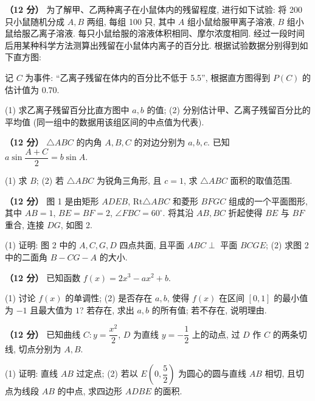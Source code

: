 \Needspace{0.4\textheight}
\begin{question}
\textbf{（12 分）} 
为了解甲、乙两种离子在小鼠体内的残留程度, 进行如下试验: 将 200 只小鼠随机分成 $A, B$ 两组, 每组 100 只, 其中 $A$ 组小鼠给服甲离子溶液, $B$ 组小鼠给服乙离子溶液. 每只小鼠给服的溶液体积相同、摩尔浓度相同. 经过一段时间后用某种科学方法测算出残留在小鼠体内离子的百分比. 根据试验数据分别得到如下直方图:
\nopagebreak[4]
\begin{center}\end{center}
\nopagebreak[4]
记 $C$ 为事件: “乙离子残留在体内的百分比不低于 5.5”, 根据直方图得到 $P(C)$ 的估计值为 $0.70$.

(1) 求乙离子残留百分比直方图中 $a, b$ 的值;  
(2) 分别估计甲、乙离子残留百分比的平均值 (同一组中的数据用该组区间的中点值为代表).

\end{question}
\begin{question}
\textbf{（12 分）} 
$\triangle ABC$ 的内角 $A, B, C$ 的对边分别为 $a, b, c$. 已知 $a \sin \dfrac{A+C}{2} = b \sin A$.

(1) 求 $B$;  
(2) 若 $\triangle ABC$ 为锐角三角形, 且 $c = 1$, 求 $\triangle ABC$ 面积的取值范围.

\Needspace{0.4\textheight}
\end{question}
\begin{question}
\textbf{（12 分）} 
图 1 是由矩形 $ADEB$, $\text{Rt}\triangle ABC$ 和菱形 $BFGC$ 组成的一个平面图形, 其中 $AB = 1$, $BE = BF = 2$, $\angle FBC = 60^\circ$. 将其沿 $AB, BC$ 折起使得 $BE$ 与 $BF$ 重合, 连接 $DG$, 如图 2.
\nopagebreak[4]
\begin{center}\end{center}
\nopagebreak[4]
(1) 证明: 图 2 中的 $A, C, G, D$ 四点共面, 且平面 $ABC \perp$ 平面 $BCGE$;  
(2) 求图 2 中的二面角 $B - CG - A$ 的大小.

\end{question}
\begin{question}
\textbf{（12 分）} 
已知函数 $f(x) = 2x^3 - ax^2 + b$.

(1) 讨论 $f(x)$ 的单调性;  
(2) 是否存在 $a, b$, 使得 $f(x)$ 在区间 $[0, 1]$ 的最小值为 $-1$ 且最大值为 $1$? 若存在, 求出 $a, b$ 的所有值; 若不存在, 说明理由.

\end{question}
\begin{question}
\textbf{（12 分）} 
已知曲线 $C: y = \dfrac{x^2}{2}$, $D$ 为直线 $y = -\dfrac{1}{2}$ 上的动点, 过 $D$ 作 $C$ 的两条切线, 切点分别为 $A, B$.

(1) 证明: 直线 $AB$ 过定点;  
(2) 若以 $E\left(0, \dfrac{5}{2}\right)$ 为圆心的圆与直线 $AB$ 相切, 且切点为线段 $AB$ 的中点, 求四边形 $ADBE$ 的面积.

\par\medskip

\end{question}

